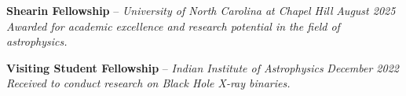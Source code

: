 \textbf{Shearin Fellowship} -- \textit{University of North Carolina at Chapel Hill} \hfill \textit{August 2025} \\
\textit{Awarded for academic excellence and research potential in the field of astrophysics.}

\vspace{0.5em}

\textbf{Visiting Student Fellowship} -- \textit{Indian Institute of Astrophysics} \hfill \textit{December 2022} \\
\textit{Received to conduct research on Black Hole X-ray binaries.}